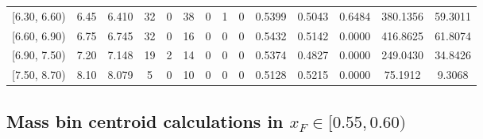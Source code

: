 \begin{table}[htbp]
{\begin{tabular}{cc|c|cccccc|ccc|cc}
        {[6.30, 6.60)} & 6.45 & 6.410 & 32 & 0 & 38 & 0 & 1 & 0 & 0.5399 & 0.5043 & 0.6484 & 380.1356 & 59.3011 \\
        {[6.60, 6.90)} & 6.75 & 6.745 & 32 & 0 & 16 & 0 & 0 & 0 & 0.5432 & 0.5142 & 0.0000 & 416.8625 & 61.8074 \\
        {[6.90, 7.50)} & 7.20 & 7.148 & 19 & 2 & 14 & 0 & 0 & 0 & 0.5374 & 0.4827 & 0.0000 & 249.0430 & 34.8426 \\
        {[7.50, 8.70)} & 8.10 & 8.079 & 5 & 0 & 10 & 0 & 0 & 0 & 0.5128 & 0.5215 & 0.0000 & 75.1912 & 9.3068 \\
        \hline\hline
    \end{tabular}
    }
\end{table}

\clearpage
\subsection{\texorpdfstring{Mass bin centroid calculations in $x_F \in [0.55, 0.60)$}{Mass bin centroid calculations in x\_F in [0.55, 0.60)]}}

